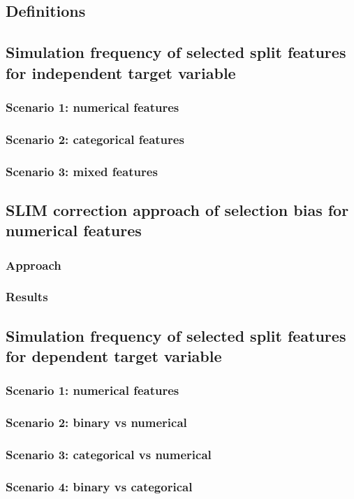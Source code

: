 \subsection{Definitions}

\subsection{Simulation frequency of selected split features for independent target variable}
\subsubsection{Scenario 1: numerical features}
\subsubsection{Scenario 2: categorical features}
\subsubsection{Scenario 3: mixed features}
\subsection{SLIM correction approach of selection bias for numerical features}
\subsubsection{Approach}
\subsubsection{Results}

\subsection{Simulation frequency of selected split features for dependent target variable}
\subsubsection{Scenario 1: numerical features}
\subsubsection{Scenario 2: binary vs numerical}
\subsubsection{Scenario 3: categorical vs  numerical}
\subsubsection{Scenario 4: binary vs  categorical}


